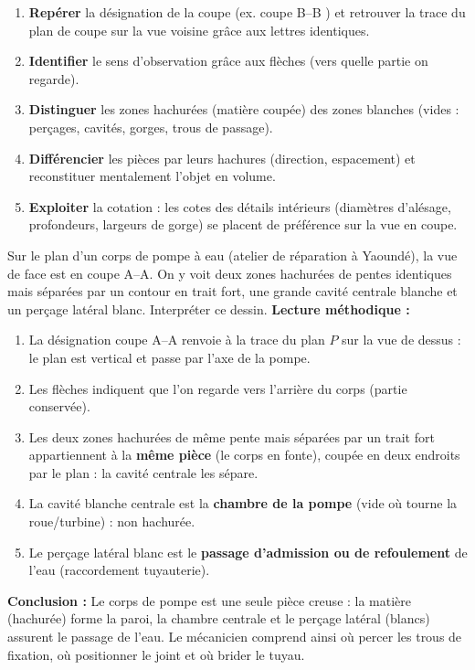 \documentclass[11pt]{article}
\begin{document}
\begin{methode}
\begin{enumerate}
\item \textbf{Repérer} la désignation de la coupe (ex. \og coupe B--B \fg) et retrouver la trace du plan de coupe sur la vue voisine grâce aux lettres identiques.
\item \textbf{Identifier} le sens d'observation grâce aux flèches (vers quelle partie on regarde).
\item \textbf{Distinguer} les zones hachurées (matière coupée) des zones blanches (vides : perçages, cavités, gorges, trous de passage).
\item \textbf{Différencier} les pièces par leurs hachures (direction, espacement) et reconstituer mentalement l'objet en volume.
\item \textbf{Exploiter} la cotation : les cotes des détails intérieurs (diamètres d'alésage, profondeurs, largeurs de gorge) se placent de préférence sur la vue en coupe.
\end{enumerate}
\end{methode}

\begin{exoresolu}
Sur le plan d'un corps de pompe à eau (atelier de réparation à Yaoundé), la vue de face est en coupe A--A. On y voit deux zones hachurées de pentes identiques mais séparées par un contour en trait fort, une grande cavité centrale blanche et un perçage latéral blanc. Interpréter ce dessin.
\tcblower
\textbf{Lecture méthodique :}
\begin{enumerate}
\item La désignation \og coupe A--A \fg renvoie à la trace du plan $P$ sur la vue de dessus : le plan est vertical et passe par l'axe de la pompe.
\item Les flèches indiquent que l'on regarde vers l'arrière du corps (partie conservée).
\item Les deux zones hachurées de même pente mais séparées par un trait fort appartiennent à la \textbf{même pièce} (le corps en fonte), coupée en deux endroits par le plan : la cavité centrale les sépare.
\item La cavité blanche centrale est la \textbf{chambre de la pompe} (vide où tourne la roue/turbine) : non hachurée.
\item Le perçage latéral blanc est le \textbf{passage d'admission ou de refoulement} de l'eau (raccordement tuyauterie).
\end{enumerate}
\textbf{Conclusion :} Le corps de pompe est une seule pièce creuse : la matière (hachurée) forme la paroi, la chambre centrale et le perçage latéral (blancs) assurent le passage de l'eau. Le mécanicien comprend ainsi où percer les trous de fixation, où positionner le joint et où brider le tuyau.
\end{exoresolu}
\end{document}
